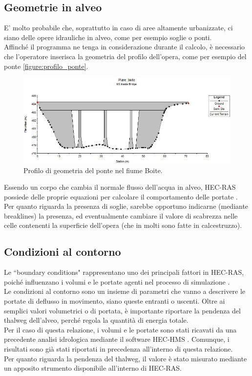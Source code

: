 \subsection{Geometrie in alveo}
E' molto probabile che, soprattutto in caso di aree altamente urbanizzate, ci siano delle opere idrauliche in alveo, come per esempio soglie o ponti.\\
Affinché il programma ne tenga in considerazione durante il calcolo, è necessario che l'operatore inserisca la geometria del profilo dell'opera, come per esempio del ponte \eqref{figure:profilo_ponte}. 
\begin{figure}[htb] \centering
    \includegraphics[scale=0.6]{immagini/profilo_ponte.JPG}
    \caption{Profilo di geometria del ponte nel fiume Boite.}
    \label{figure:profilo_ponte}
    \end{figure}
Essendo un corpo che cambia il normale flusso dell'acqua in alveo, HEC-RAS possiede delle proprie equazioni per calcolare il comportamento delle portate \cite{modeling_bridges}.\\
Per quanto riguarda la presenza di soglie, sarebbe opportuno indicarne (mediante breaklines) la presenza, ed eventualmente cambiare il valore di scabrezza nelle celle contenenti la superficie dell'opera (che in molti sono fatte in calcestruzzo).

\subsection{Condizioni al contorno}
Le ``boundary conditions" rappresentano uno dei principali fattori in HEC-RAS, poiché influenzano i volumi e le portate agenti nel processo di simulazione \cite{boundary_conditions}.\\
Le condizioni al contorno sono un insieme di parametri che vanno a descrivere le portate di deflusso in movimento, siano queste entranti o uscenti. Oltre ai semplici valori volumetrici o di portata, è importante riportare la pendenza del thalweg dell'alveo, perché regola la quantità di energia totale.\\
Per il caso di questa relazione, i volumi e le portate sono stati ricavati da una precedente analisi idrologica mediante il software HEC-HMS \cite{progetto_hms}. Comunque, i risultati sono già stati riportati in precedenza all'interno di questa relazione.\\
Per quanto riguarda la pendenza del thalweg, il valore è stato misurato mediante un apposito strumento disponibile all'interno di HEC-RAS. 